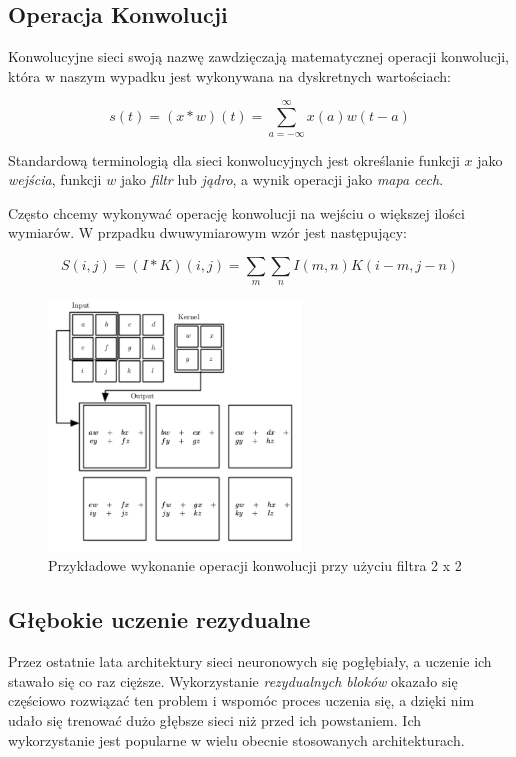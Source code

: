 \documentclass[licencjacka]{pracamgr}
\begin{document}
\subsection{Operacja Konwolucji}

Konwolucyjne sieci swoją nazwę zawdzięczają matematycznej operacji konwolucji, która w naszym wypadku jest wykonywana na dyskretnych wartościach:

$$ s(t) = (x * w)(t) = \sum_{a = -\infty}^{\infty} x(a)w(t - a) $$

Standardową terminologią dla sieci konwolucyjnych jest określanie funkcji $x$ jako \emph{wejścia}, funkcji $w$ jako \emph{filtr} lub \emph{jądro}, a wynik operacji jako \emph{mapa cech}.

Często chcemy wykonywać operację konwolucji na wejściu o większej ilości wymiarów. W przpadku dwuwymiarowym wzór jest następujący:

$$ S(i, j) = (I * K)(i, j) = \sum_m \sum_n I(m, n) K(i - m, j - n) $$


\begin{figure}[ht!]
  \centering
  \includegraphics[width=0.6\textwidth]{konwolucja}
  \caption{Przykładowe wykonanie operacji konwolucji przy użyciu filtra 2 x 2}
\end{figure}

\subsection{Głębokie uczenie rezydualne}

Przez ostatnie lata architektury sieci neuronowych się pogłębiały, a uczenie ich stawało się co raz cięższe. Wykorzystanie \emph{rezydualnych bloków} \cite{resnet} okazało się częściowo rozwiązać ten problem i wspomóc proces uczenia się, a dzięki nim udało się trenować dużo głębsze sieci niż przed ich powstaniem. Ich wykorzystanie jest popularne w wielu obecnie stosowanych architekturach.
\end{document}
